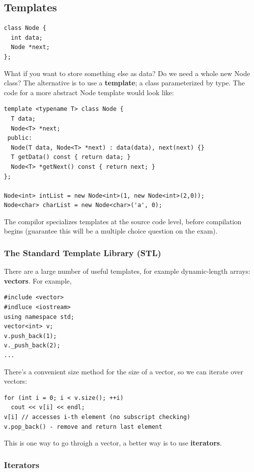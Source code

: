 \documentclass[english, 11pt]{article}
\begin{document}
\subsection{Templates}

\begin{lstlisting}
class Node {
  int data;
  Node *next;
};
\end{lstlisting}

What if you want to store something else as data? Do we need a whole new Node class? The alternative is to use a \textbf{template}; a class parameterized by type. The code for a more abstract Node template would look like:

\begin{lstlisting}
template <typename T> class Node {
  T data;
  Node<T> *next;
 public:
  Node(T data, Node<T> *next) : data(data), next(next) {}
  T getData() const { return data; }
  Node<T> *getNext() const { return next; }
};

Node<int> intList = new Node<int>(1, new Node<int>(2,0));
Node<char> charList = new Node<char>('a', 0);
\end{lstlisting}
The compilor specializes templates at the source code level, before compilation begins (guarantee this will be a multiple choice question on the exam). \\

\subsubsection{The Standard Template Library (STL)}

There are a large number of useful templates, for example dynamic-length arrays: \textbf{vectors}. For example,
\begin{lstlisting}
#include <vector>
#indluce <iostream>
using namespace std;
vector<int> v;
v.push_back(1);
v._push_back(2);
...
\end{lstlisting}
There's a convenient size method for the size of a vector, so we can iterate over vectors:
\begin{lstlisting}
for (int i = 0; i < v.size(); ++i)
  cout << v[i] << endl;
v[i] // accesses i-th element (no subscript checking)
v.pop_back() - remove and return last element
\end{lstlisting}

This is one way to go throigh a vector, a better way is to use \textbf{iterators}. \\

\subsubsection{Iterators}
\end{document}
